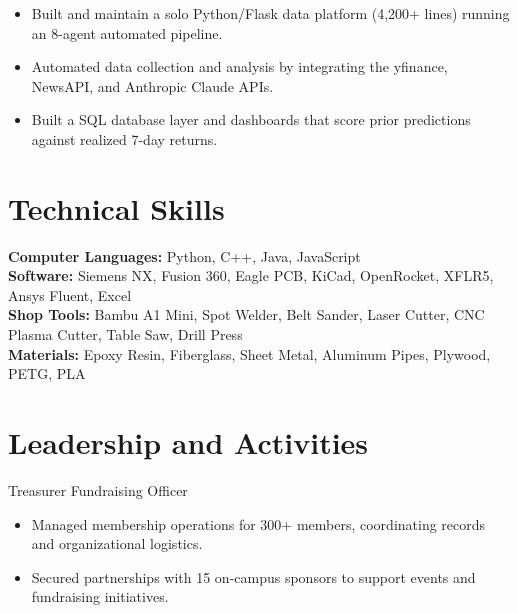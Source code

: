 \begin{itemize}
  \item Built and maintain a solo Python/Flask data platform (4,200+ lines) running an 8-agent automated pipeline.
  \item Automated data collection and analysis by integrating the yfinance, NewsAPI, and Anthropic Claude APIs.
  \item Built a SQL database layer and dashboards that score prior predictions against realized 7-day returns.
\end{itemize}

\section{Technical Skills}
\textbf{Computer Languages:} Python, C++, Java, JavaScript\\
\textbf{Software:} Siemens NX, Fusion 360, Eagle PCB, KiCad, OpenRocket, XFLR5, Ansys Fluent, Excel\\
\textbf{Shop Tools:} Bambu A1 Mini, Spot Welder, Belt Sander, Laser Cutter, CNC Plasma Cutter, Table Saw, Drill Press\\
\textbf{Materials:} Epoxy Resin, Fiberglass, Sheet Metal, Aluminum Pipes, Plywood, PETG, PLA

\section{Leadership and Activities}

Treasurer \textbar{} Fundraising Officer
\begin{itemize}
  \item Managed membership operations for 300+ members, coordinating records and organizational logistics.
  \item Secured partnerships with 15 on-campus sponsors to support events and fundraising initiatives.
\end{itemize}
\entrygap

